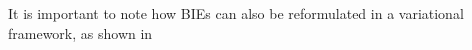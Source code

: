 It is important to note how \glspl{BIE} can also be reformulated in a
variational framework, as shown in 

\begin{comment}

\section{The Galerkin Method}

\todo[inline]{Write this section}
Approximability, conformity, consistency and asymptotic consistency
of the approximation setting, $\inf$-$\sup$ condition, Céa's Lemma
and generalized $\inf$-$\sup$ condition.\autocite{Ern2004-oo}

\section{Mixed Blabbering}


\end{comment}
